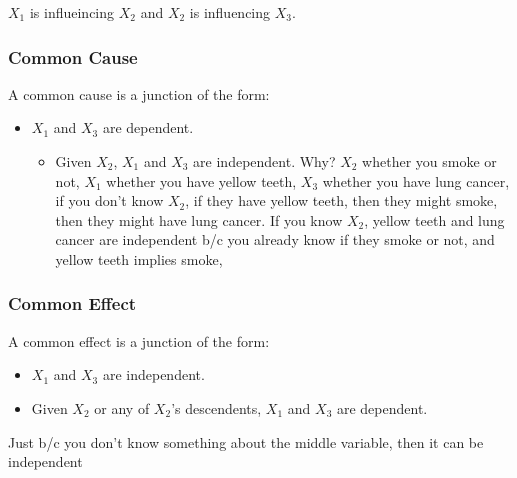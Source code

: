 \begin{warning}
    $X_1$ is influeincing $X_2$ and $X_2$ is influencing $X_3$.
\end{warning}

\subsubsection{Common Cause}
\begin{definition}
    A common cause is a junction of the form: 
\end{definition}

\begin{notes}
    \begin{itemize}
        \item $X_1$ and $X_3$ are dependent. 
        \begin{itemize}
            \item Given $X_2$, $X_1$ and $X_3$ are independent. Why? $X_2$ whether you smoke or not, $X_1$ whether you have yellow teeth, $X_3$ whether you have lung cancer, if you don't know $X_2$, if they have yellow teeth, then they might smoke, then they might have lung cancer. If you know $X_2$, yellow teeth and lung cancer are independent b/c you already know if they smoke or not, and yellow teeth implies smoke, 
        \end{itemize}
    \end{itemize}
\end{notes}

\subsubsection{Common Effect}
\begin{definition}
    A common effect is a junction of the form:
    
\end{definition}

\begin{notes}
    \begin{itemize}
        \item $X_1$ and $X_3$ are independent. 
        \item Given $X_2$ or any of $X_2$'s descendents, $X_1$ and $X_3$ are dependent.
    \end{itemize}
\end{notes}

\begin{warning}
    Just b/c you don't know something about the middle variable, then it can be independent
\end{warning}

